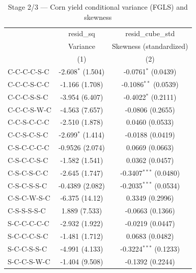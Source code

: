 
\begin{table}[H]
   \caption{\label{tab:corn_jp_moments} Stage 2/3 — Corn yield conditional variance (FGLS) and skewness}
   \bigskip
   \centering
   \begin{tabular}{lcc}
      \toprule
                                      & resid\_sq            & resid\_cube\_std\\    
                                      & Variance             & Skewness (standardized) \\   
                                      & (1)                  & (2)\\  
      \midrule 
      C-C-C-C-S-C                     & -2.608$^{*}$ (1.504) & -0.0761$^{*}$ (0.0439)\\   
      C-C-C-S-C-C                     & -1.166 (1.708)       & -0.1086$^{**}$ (0.0539)\\   
      C-C-C-S-S-C                     & -3.954 (6.407)       & -0.4022$^{*}$ (0.2111)\\   
      C-C-C-S-W-C                     & -4.563 (7.657)       & -0.0806 (0.2655)\\   
      C-C-S-C-C-C                     & -2.510 (1.878)       & 0.0460 (0.0533)\\   
      C-C-S-C-S-C                     & -2.699$^{*}$ (1.414) & -0.0188 (0.0419)\\   
      C-S-C-C-C-C                     & -0.9526 (2.074)      & 0.0669 (0.0663)\\   
      C-S-C-C-S-C                     & -1.582 (1.541)       & 0.0362 (0.0457)\\   
      C-S-C-S-C-C                     & -2.645 (1.747)       & -0.3407$^{***}$ (0.0480)\\   
      C-S-C-S-S-C                     & -0.4389 (2.082)      & -0.2035$^{***}$ (0.0534)\\   
      C-S-C-W-S-C                     & -6.375 (14.12)       & 0.3349 (0.2996)\\   
      C-S-S-S-S-C                     & 1.889 (7.533)        & -0.0663 (0.1366)\\   
      S-C-C-C-C-C                     & -2.932 (1.922)       & -0.0219 (0.0447)\\   
      S-C-C-C-S-C                     & -1.481 (1.712)       & 0.0683 (0.0482)\\   
      S-C-C-S-S-C                     & -4.991 (4.133)       & -0.3224$^{***}$ (0.1233)\\   
      S-C-C-S-W-C                     & -1.404 (9.508)       & -0.1392 (0.2244)\\   

\end{tabular}
\end{table}
